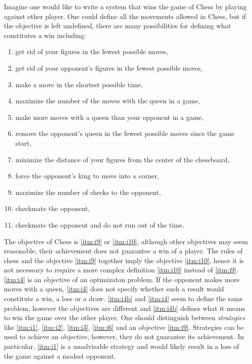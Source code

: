 Imagine one would like to write a system that wins the game of Chess by playing against other player. One could define all the movements allowed in Chess, but if the objective is left undefined, there are many possibilities for defining what constitutes a win including:
\begin{enumerate}
\item\label{itm:i1} get rid of your figures in the fewest possible moves,
\item\label{itm:i2} get rid of your opponent's figures in the fewest possible moves,
\item\label{itm:i3} make a move in the shortest possible time,
\item\label{itm:i4} maximize the number of the moves with the queen in a game,
\item\label{itm:i4b} make more moves with a queen than your opponent in a game,
\item\label{itm:i5} remove the opponent's queen in the fewest possible moves since the game start,
\item\label{itm:i6} minimize the distance of your figures from the center of the chessboard,
\item\label{itm:i7} force the opponent's king to move into a corner,
\item\label{itm:i8} maximize the number of checks to the opponent,
\item\label{itm:i9} checkmate the opponent,
\item\label{itm:i10} checkmate the opponent and do not run out of the time.
\end{enumerate}
The objective of Chess is \ref{itm:i9} or \ref{itm:i10}, although other objectives may seem reasonable, their achievement does not guarantee a win of a player. The rules of chess and the objective \ref{itm:i9} together imply the objective \ref{itm:i10}, hence it is not necessary to require a more complex definition \ref{itm:i10} instead of \ref{itm:i9}. \ref{itm:i4} is an objective of an optimizaton problem. If the opponent makes more moves with a queen, \ref{itm:i4} does not specify whether such a result would constitute a win, a loss or a draw.
\ref{itm:i4b} and \ref{itm:i4} seem to define the same problem, however the objectives are different and \ref{itm:i4b} defines what it means to win the game over the other player.
One should distinguish between \emph{strategies} like \ref{itm:i1}, \ref{itm:i2}, \ref{itm:i3}, \ref{itm:i6} and an objective \ref{itm:i9}. Strategies can be used to achieve an objective, however, they do not guarantee its achievement. In particular, \ref{itm:i1} is a unadvisable strategy and would likely result in a loss of the game against a modest opponent.

